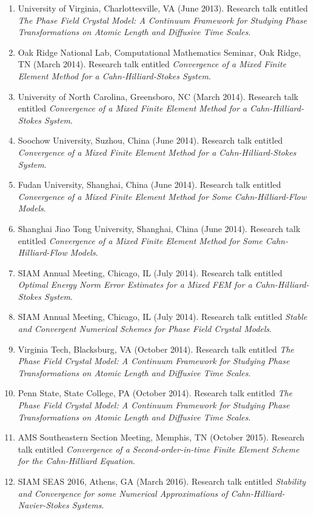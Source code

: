 \documentclass[10pt,letterpaper]{article}
\begin{document}
\begin{enumerate}
	\item
University of Virginia, Charlottesville, VA (June 2013).  Research talk entitled {\sl The Phase Field Crystal Model: A Continuum Framework for Studying Phase Transformations on Atomic Length and Diffusive Time Scales}.
	\item
Oak Ridge National Lab, Computational Mathematics Seminar, Oak Ridge, TN (March 2014). Research talk entitled {\sl Convergence of a Mixed Finite Element Method for a Cahn-Hilliard-Stokes System}.
	\item
University of North Carolina, Greensboro, NC (March 2014). Research talk entitled {\sl Convergence of a Mixed Finite Element Method for a Cahn-Hilliard-Stokes System}.
	\item
Soochow University, Suzhou, China (June 2014). Research talk entitled {\sl Convergence of a Mixed Finite Element Method for a Cahn-Hilliard-Stokes System}.
	\item
Fudan University, Shanghai, China (June 2014). Research talk entitled {\sl Convergence of a Mixed Finite Element Method for Some Cahn-Hilliard-Flow Models}.
	\item
Shanghai Jiao Tong University, Shanghai, China (June 2014). Research talk entitled {\sl Convergence of a Mixed Finite Element Method for Some Cahn-Hilliard-Flow Models}.
	\item
SIAM Annual Meeting, Chicago, IL (July 2014). Research talk entitled {\sl Optimal Energy Norm Error Estimates for a Mixed FEM for a Cahn-Hilliard-Stokes System}.
	\item
SIAM Annual Meeting, Chicago, IL (July 2014). Research talk entitled {\sl Stable and Convergent Numerical Schemes for Phase Field Crystal Models}.
	\item
Virginia Tech, Blacksburg, VA (October 2014).  Research talk entitled {\sl The Phase Field Crystal Model: A Continuum Framework for Studying Phase Transformations on Atomic Length and Diffusive Time Scales}.
	\item
Penn State, State College, PA (October 2014).  Research talk entitled {\sl The Phase Field Crystal Model: A Continuum Framework for Studying Phase Transformations on Atomic Length and Diffusive Time Scales}.
	\item
AMS Southeastern Section Meeting, Memphis, TN (October 2015). Research talk entitled {\sl Convergence of a Second-order-in-time Finite Element Scheme for the Cahn-Hilliard Equation}.
	\item
SIAM SEAS 2016, Athens, GA (March 2016). Research talk entitled {\sl Stability and Convergence for some Numerical Approximations of Cahn-Hilliard-Navier-Stokes Systems}.

\end{enumerate}
\end{document}
